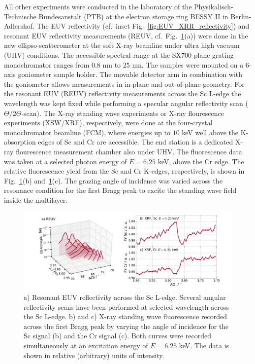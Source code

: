 All other experiments were conducted in the laboratory of the Physikalisch-Technische Bundesanstalt (PTB) at the electron storage ring BESSY II in Berlin-Adlershof. The EUV reflectivity (cf.~inset Fig.~\ref{fig:EUV_XRR_reflectivity}) and resonant EUV reflectivity measurements (REUV, cf.~Fig.~\ref{fig:REUV_XRF_data}(a)) were done in the new ellipso-scatterometer at the soft X-ray beamline \cite{Beckhoff2009} under ultra high vacuum (UHV) conditions. The accessible spectral range at the SX700 plane grating monochromator ranges from $0.8$ nm to $25$ nm. The samples were mounted on a 6-axis goniometer sample holder. The movable detector arm in combination with the goniometer allows measurements in in-plane and out-of-plane geometry. For the resonant EUV (REUV) reflectivity measurements across the Sc L-edge the wavelength was kept fixed while performing a specular angular reflectivity scan ($\Theta$/$2\Theta$-scan). The X-ray standing wave experiments or X-ray flourescence experiments (XSW/XRF), respectively, 
were done at the four-crystal monochromator beamline (FCM), where energies up to $10$ keV well above the K-absorption edges of Sc and Cr are accessible. The end station is a dedicated X-ray flourescence measurement chamber also under UHV. The fluorescence data was taken at a selected photon energy of $E=6.25$ keV, above the Cr edge. The relative fluorescence yield from the Sc and Cr K-edges, respectively, is shown in Fig.~\ref{fig:REUV_XRF_data}(b) and~\ref{fig:REUV_XRF_data}(c). The grazing angle of incidence was varied across the resonance condition for the first Bragg peak to excite the standing wave field inside the multilayer.
\onecolumn
\begin{figure}
  \centering
  \includegraphics[width=\textwidth]{img/im_cr_sc_multilayer/reuv_xrf_data}
  \caption{a) Resonant EUV reflectivity across the Sc L-edge. Several angular reflectivity scans have been performed at selected wavelength across the Sc L-edge. b) and c) X-ray standing wave fluorescence recorded across the first Bragg peak by varying the angle of incidence for the Sc signal (b) and the Cr signal (c). Both curves were recorded simultaneously at an excitation energy of $E=6.25$ keV. The data is shown in relative (arbitrary) units of intensity.}
  \label{fig:REUV_XRF_data}
\end{figure}


